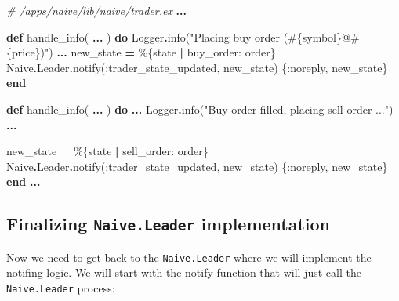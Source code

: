 \documentclass[
  oneside]{book}
\newenvironment{Shaded}{\begin{snugshade}}{\end{snugshade}}
\newcommand{\CommentTok}[1]{\textcolor[rgb]{0.56,0.35,0.01}{\textit{#1}}}
\newcommand{\ConstantTok}[1]{\textcolor[rgb]{0.00,0.00,0.00}{#1}}
\newcommand{\KeywordTok}[1]{\textcolor[rgb]{0.13,0.29,0.53}{\textbf{#1}}}
\newcommand{\NormalTok}[1]{#1}
\newcommand{\OperatorTok}[1]{\textcolor[rgb]{0.81,0.36,0.00}{\textbf{#1}}}
\newcommand{\OtherTok}[1]{\textcolor[rgb]{0.56,0.35,0.01}{#1}}
\newcommand{\StringTok}[1]{\textcolor[rgb]{0.31,0.60,0.02}{#1}}
\newcommand{\VariableTok}[1]{\textcolor[rgb]{0.00,0.00,0.00}{#1}}
\begin{document}
\begin{Shaded}
\begin{Highlighting}[]
  \CommentTok{\# /apps/naive/lib/naive/trader.ex}
  \OperatorTok{...}

  \KeywordTok{def}\NormalTok{ handle\_info(}
        \OperatorTok{...}
\NormalTok{      ) }\KeywordTok{do}
    \ConstantTok{Logger}\OperatorTok{.}\NormalTok{info(}\StringTok{"Placing buy order (}\OtherTok{\#\{}\NormalTok{symbol}\OtherTok{\}}\StringTok{@}\OtherTok{\#\{}\NormalTok{price}\OtherTok{\}}\StringTok{)"}\NormalTok{)}
    \OperatorTok{...}
\NormalTok{    new\_state }\OperatorTok{=}\NormalTok{ \%\{state }\OperatorTok{|} \VariableTok{buy\_order:}\NormalTok{ order\}}
    \ConstantTok{Naive}\OperatorTok{.}\ConstantTok{Leader}\OperatorTok{.}\NormalTok{notify(}\VariableTok{:trader\_state\_updated}\NormalTok{, new\_state)}
\NormalTok{    \{}\VariableTok{:noreply}\NormalTok{, new\_state\}}
  \KeywordTok{end}

  \KeywordTok{def}\NormalTok{ handle\_info(}
        \OperatorTok{...}
\NormalTok{      ) }\KeywordTok{do}
    \OperatorTok{...}
    \ConstantTok{Logger}\OperatorTok{.}\NormalTok{info(}\StringTok{"Buy order filled, placing sell order ..."}\NormalTok{)  }
    \OperatorTok{...}

\NormalTok{    new\_state }\OperatorTok{=}\NormalTok{ \%\{state }\OperatorTok{|} \VariableTok{sell\_order:}\NormalTok{ order\}}
    \ConstantTok{Naive}\OperatorTok{.}\ConstantTok{Leader}\OperatorTok{.}\NormalTok{notify(}\VariableTok{:trader\_state\_updated}\NormalTok{, new\_state)}
\NormalTok{    \{}\VariableTok{:noreply}\NormalTok{, new\_state\}}
  \KeywordTok{end}
  \OperatorTok{...}
\end{Highlighting}
\end{Shaded}

\hypertarget{finalizing-naive.leader-implementation}{%
\subsection{\texorpdfstring{Finalizing \texttt{Naive.Leader} implementation}{Finalizing Naive.Leader implementation}}\label{finalizing-naive.leader-implementation}}

Now we need to get back to the \texttt{Naive.Leader} where we will implement the notifing logic. We will start with the notify function that will just call the \texttt{Naive.Leader} process:
\end{document}
